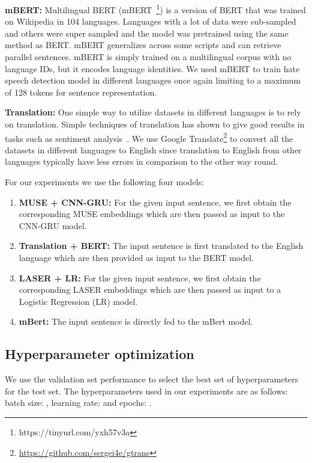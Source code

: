 \documentclass[runningheads]{llncs}
\begin{document}
\noindent\textbf{mBERT:} Multilingual BERT (mBERT~\footnote{https://tinyurl.com/yxh57v3a}) is a version of BERT that was trained on Wikipedia in 104 languages. Languages with a lot of data were sub-sampled and others were super sampled and the model was pretrained using the same method as BERT. mBERT generalizes across some scripts and can retrieve parallel sentences. mBERT is simply trained on a multilingual corpus with no language IDs, but it encodes language identities. We used mBERT to train hate speech detection model in different languages once again limiting to a maximum of 128 tokens for sentence representation. 

\noindent\textbf{Translation:} One simple way to utilize datasets in different languages is to rely on translation. Simple techniques of translation has shown to give good results in tasks such as sentiment analysis~\cite{singhal2016borrow}. We use Google Translate\footnote{\url{https://github.com/sergei4e/gtrans}} to convert all the datasets in different languages to English since translation to English from other languages typically have less errors in comparison to the other way round. 






For our experiments we use the following four models:

\begin{enumerate}
    \item \textbf{MUSE + CNN-GRU:} For the given input sentence, we first obtain the corresponding MUSE embeddings which are then passed as input to the CNN-GRU model.
    \item \textbf{Translation + BERT:} The input sentence is first translated to the English language which are then provided as input to the BERT model.
    \item \textbf{LASER + LR:} For the given input sentence, we first obtain the corresponding LASER embeddings which are then passed as input to a Logistic Regression (LR) model.
    \item \textbf{mBert:} The input sentence is directly fed to the mBert model.
\end{enumerate}


\subsection{Hyperparameter optimization}
We use the validation set performance to select the best set of hyperparameters for the test set. The hyperparameters used in our experiments are as follows: batch size: ,
learning rate:  and
epochs: .
\end{document}
